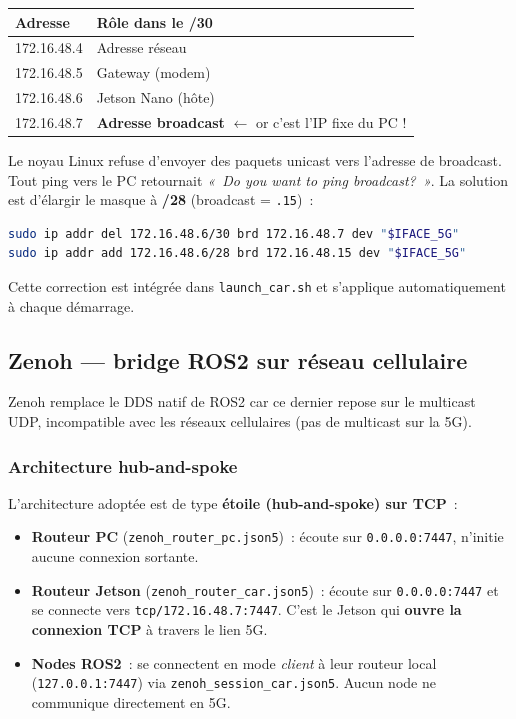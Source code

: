 \documentclass[a4paper,11pt]{article}
\begin{document}
\begin{center}
\begin{tabular}{ll}
\toprule
\textbf{Adresse} & \textbf{Rôle dans le /30} \\
\midrule
172.16.48.4 & Adresse réseau \\
172.16.48.5 & Gateway (modem) \\
172.16.48.6 & Jetson Nano (hôte) \\
172.16.48.7 & \textbf{Adresse broadcast} $\leftarrow$ or c'est l'IP fixe du PC ! \\
\bottomrule
\end{tabular}
\end{center}

Le noyau Linux refuse d'envoyer des paquets unicast vers l'adresse de broadcast.
Tout ping vers le PC retournait \textit{«~Do you want to ping broadcast?~»}.
La solution est d'élargir le masque à \textbf{/28} (broadcast = \texttt{.15})~:

\begin{lstlisting}[language=bash]
sudo ip addr del 172.16.48.6/30 brd 172.16.48.7 dev "$IFACE_5G"
sudo ip addr add 172.16.48.6/28 brd 172.16.48.15 dev "$IFACE_5G"
\end{lstlisting}

Cette correction est intégrée dans \texttt{launch\_car.sh} et s'applique
automatiquement à chaque démarrage.

\subsection{Zenoh — bridge ROS2 sur réseau cellulaire}

Zenoh remplace le DDS natif de ROS2 car ce dernier repose sur le multicast UDP,
incompatible avec les réseaux cellulaires (pas de multicast sur la 5G).

\subsubsection{Architecture hub-and-spoke}

L'architecture adoptée est de type \textbf{étoile (hub-and-spoke) sur TCP}~:

\begin{itemize}[noitemsep]
  \item \textbf{Routeur PC} (\texttt{zenoh\_router\_pc.json5})~: écoute sur
        \texttt{0.0.0.0:7447}, n'initie aucune connexion sortante.
  \item \textbf{Routeur Jetson} (\texttt{zenoh\_router\_car.json5})~: écoute sur
        \texttt{0.0.0.0:7447} et se connecte vers \texttt{tcp/172.16.48.7:7447}.
        C'est le Jetson qui \textbf{ouvre la connexion TCP} à travers le lien 5G.
  \item \textbf{Nodes ROS2}~: se connectent en mode \emph{client} à leur routeur
        local (\texttt{127.0.0.1:7447}) via \texttt{zenoh\_session\_car.json5}.
        Aucun node ne communique directement en 5G.
\end{itemize}
\end{document}
